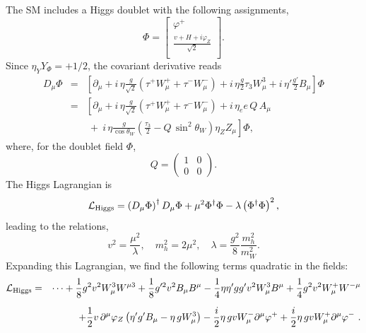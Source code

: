 \documentclass{ws-ijmpa}
\begin{document}
The SM includes a Higgs doublet with the following assignments,
%
\begin{equation}
  \label{eq:50}
  \Phi = \left[
    \begin{matrix}
      \varphi^+ \\[+2mm]
      \displaystyle
       \frac{v + H + i \varphi_Z}{\sqrt{2}} \\
    \end{matrix}
\right].
\end{equation}
%
Since $\eta_Y Y_\Phi = + 1/2$,
the covariant derivative reads
%
\begin{eqnarray}
  D_\mu \Phi
&=& \left[ \partial_\mu + i\, \eta \frac{ g}{\sqrt{2}} \left(
 \tau^+ W_\mu^+ +  \tau^- W_\mu^- \right) +i\, \eta \frac{g}{2} \tau_3 W_\mu^3
+ i\, \eta' \frac{g'}{2} B_\mu \right] \Phi
\nonumber\\[+2mm]
&=&
\left[ \partial_\mu + i\,\eta \frac{g}{\sqrt{2}} \left(
\tau^+ W_\mu^+ +  \tau^- W_\mu^- \right) +i\, \eta_e e\, Q\,   A_\mu
\right.
\nonumber\\[+2mm]
& &
\left.
\ +\  i\,\eta \frac{g}{\cos\theta_W} \left(\frac{\tau_3}{2} - Q\, \sin^2\theta_W
\right)\eta_Z Z_\mu \right] \Phi,
\label{eq:90}
\end{eqnarray}
%
where, for the doublet field $\Phi$,
%
\begin{equation}
Q =
\left(
\begin{array}{cc}
1 & 0\\
0 & 0
\end{array}
\right).
\end{equation}
%
The Higgs Lagrangian is
%
\begin{equation}
  \label{eq:93}
\mathcal{L}_{\rm Higgs} =  \left(D_\mu \Phi\right)^\dagger D_\mu \Phi
+ \mu^2 \Phi^\dagger \Phi - \lambda \left(\Phi^\dagger \Phi\right)^2 ,
\end{equation}
%
leading to the relations,
%
\begin{equation}
  \label{eq:4}
  v^2 = \frac{\mu^2}{\lambda}, \quad m_h^2 = 2 \mu^2, \quad
 \lambda= \frac{g^2}{8} \frac{m_h^2}{m_W^2}.
\end{equation}
%
Expanding this Lagrangian,
we find the following terms quadratic in the fields:
%
\begin{eqnarray}
  \mathcal{L}_{\rm Higgs}
&=&
\cdots + 
\frac{1}{8} g^2 v^2 W_\mu^3 W^{\mu 3} + \frac{1}{8} g'^2 v^2 B_\mu B^{\mu}
- \frac{1}{4}\eta \eta' g g' v^2 W_\mu^3 B^{\mu} 
+ \frac{1}{4} g^2 v^2 W_\mu^+  W^{-\mu}
\nonumber\\[+2mm]
& &
\hspace{5mm} 
+ \frac{1}{2} v\, \partial^\mu \varphi_Z \left(\eta' g' B_\mu -\eta\, g W_\mu^{3}
\right) - \frac{i}{2}\eta\, g v W_\mu^- \partial^\mu \varphi^+ 
+ \frac{i}{2}\eta\, g v W_\mu^+ \partial^\mu \varphi^- \ .
\label{eq:94}
\end{eqnarray}
\end{document}
